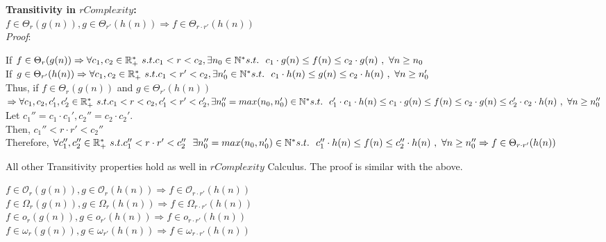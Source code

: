  \textbf{Transitivity in $rComplexity$:}  \\  $ f \in \Theta_{r}(g(n)),  g \in \Theta_{r'}(h(n)) \Rightarrow  f \in \Theta_{r \cdot r'}(h(n))$    
 \\\textit{Proof}:

	If $ f \in \Theta_{r}(g(n)) \Rightarrow \forall c_{1}, c_{2} \in \mathbb{R}^{*}_{+} \ s.t.  c_{1}< r < c_{2} , \exists n_{0} \in \mathbb{N}^{*}\ \\ s.t.\ \ c_{1} \cdot g(n) \leq f(n) \leq c_{2} \cdot g(n)\ ,\  \forall n \geq n_{0} $ \\
	If $ g \in \Theta_{r'}(h(n)) \Rightarrow \forall c_{1}, c_{2} \in \mathbb{R}^{*}_{+} \ s.t.  c_{1} < r' < c_{2} , \exists n_{0}' \in \mathbb{N}^{*}\ \\ s.t.\ \ c_{1} \cdot h(n) \leq g(n) \leq c_{2} \cdot h(n)\ ,\  \forall n \geq n_{0}' $ \\
	Thus, if $ f \in \Theta_{r}(g(n))$ and $ g \in \Theta_{r'}(h(n))$ \\ $\Rightarrow \forall c_{1}, c_{2}, c_{1}', c_{2}' \in \mathbb{R}^{*}_{+} \ s.t.  c_{1} < r < c_{2}, c_{1}' < r' < c_{2}' , \exists n''_{0}=max(n_{0}, n'_{0}) \in \mathbb{N}^{*}\ \\ s.t.\ \ c_{1}' \cdot c_{1} \cdot h(n) \leq c_{1} \cdot g(n) \leq f(n) \leq c_{2} \cdot g(n) \leq c_{2}' \cdot c_{2} \cdot h(n)\ ,\  \forall n \geq n''_{0} $ \\
	Let $c_{1}'' = c_{1} \cdot c_{1}' , c_{2}'' = c_{2} \cdot c_{2}'$. \\
	Then, $c_{1}'' < r \cdot r' < c_{2}''$ \\ 
	Therefore, $\forall c_{1}'', c_{2}'' \in \mathbb{R}^{*}_{+} \ s.t.  c_{1}'' < r \cdot r' < c_{2}'' \ \ \exists n''_{0}=max(n_{0}, n'_{0}) \in \mathbb{N}^{*}\ \\ s.t.\ \ c_{1}'' \cdot h(n) \leq f(n) \leq c_{2}'' \cdot h(n)\ ,\  \forall n \geq n''_{0} \Rightarrow f \in \Theta_{r \cdot r'}(h(n))$ \\

\qedsymbol

All other Transitivity properties hold as well in $rComplexity$ Calculus. The proof is similar with the above.

 $ f \in \mathcal{O}_{r}(g(n)),  g \in \mathcal{O}_{r}(h(n)) \Rightarrow  f \in \mathcal{O}_{r \cdot r'}(h(n))$ \\
 $ f \in \Omega_{r}(g(n)),  g \in \Omega_{r}(h(n)) \Rightarrow  f \in \Omega_{r \cdot r'}(h(n))$ \\
 $ f \in o_{r}(g(n)),  g \in o_{r'}(h(n)) \Rightarrow  f \in o_{r \cdot r'}(h(n))$ \\
 $ f \in \omega_{r}(g(n)),  g \in \omega_{r'}(h(n)) \Rightarrow  f \in \omega_{r \cdot r'}(h(n))$
 
